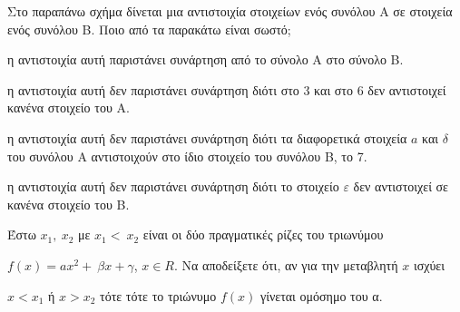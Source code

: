 \begin{alist}
\item Στο παραπάνω σχήμα δίνεται μια αντιστοιχία στοιχείων ενός συνόλου Α σε στοιχεία ενός συνόλου Β. Ποιο από τα παρακάτω είναι σωστό;
\begin{rlist}
\item η αντιστοιχία αυτή παριστάνει συνάρτηση από το σύνολο Α στο σύνολο Β.
\item η αντιστοιχία αυτή δεν παριστάνει συνάρτηση διότι στο 3 και στο 6 δεν αντιστοιχεί κανένα στοιχείο του Α.
\item η αντιστοιχία αυτή δεν παριστάνει συνάρτηση διότι τα διαφορετικά στοιχεία $a$ και $\delta$ του συνόλου Α αντιστοιχούν στο ίδιο στοιχείο του συνόλου Β, το 7.
\item η αντιστοιχία αυτή δεν παριστάνει συνάρτηση διότι το στοιχείο $\varepsilon$ δεν αντιστοιχεί σε κανένα στοιχείο του Β.
\end{rlist}

\item Έστω $x_{1},\ x_{2}$ με $x_{1} < \ x_{2}$ είναι οι δύο πραγματικές ρίζες του τριωνύμου

$f(x) = a x^{2} + \ \beta x + \gamma$, $x \in R$. Να αποδείξετε ότι, αν για την μεταβλητή $x$ ισχύει

$x < x_{1}$ ή $x > x_{2}$ τότε τότε το τριώνυμο $f(x)$ γίνεται ομόσημο του α.
\end{alist}

